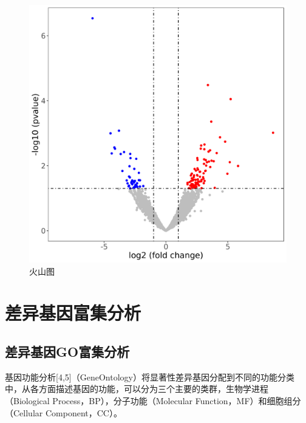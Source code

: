 \documentclass[
]{ctexart}
\begin{document}
\begin{figure}[H]

{\centering \includegraphics[width=1\linewidth]{./1.picture/4.2.TVSC.Volcano} 

}

\caption{火山图}\label{fig:unnamed-chunk-10}
\end{figure}

\hypertarget{ux5deeux5f02ux57faux56e0ux5bccux96c6ux5206ux6790}{%
\section{差异基因富集分析}\label{ux5deeux5f02ux57faux56e0ux5bccux96c6ux5206ux6790}}

\hypertarget{ux5deeux5f02ux57faux56e0goux5bccux96c6ux5206ux6790}{%
\subsection{差异基因GO富集分析}\label{ux5deeux5f02ux57faux56e0goux5bccux96c6ux5206ux6790}}

基因功能分析{[}4,5{]}（GeneOntology）将显著性差异基因分配到不同的功能分类中，从各方面描述基因的功能，可以分为三个主要的类群，生物学进程（Biological Process，BP），分子功能（Molecular Function，MF）和细胞组分（Cellular Component，CC）。
\end{document}
